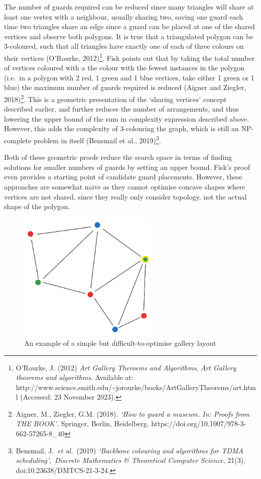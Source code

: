 \documentclass[
]{article}
\begin{document}
The number of guards required can be reduced since many triangles will
share at least one vertex with a neighbour, usually sharing two, saving
one guard each time two triangles share an edge since a guard can be
placed at one of the shared vertices and observe both polygons. It is
true that a triangulated polygon can be 3-coloured, such that all
triangles have exactly one of each of three colours on their vertices
(O'Rourke, 2012)\footnote{O'Rourke, J. (2012) \emph{Art Gallery Theroems
  and Algorithms}, \emph{Art Gallery theorems and algorithms}. Available
  at:
  http://www.science.smith.edu/\textasciitilde jorourke/books/ArtGalleryTheorems/art.html
  (Accessed: 23 November 2023).}. Fisk points out that by taking the
total number of vertices coloured with a the colour with the fewest
instances in the polygon (i.e.~in a polygon with 2 red, 1 green and 1
blue vertices, take either 1 green or 1 blue) the maximum number of
guards required is reduced (Aigner and Ziegler, 2018)\footnote{Aigner,
  M., Ziegler, G.M. (2018). \emph{`How to guard a museum. In: Proofs
  from THE BOOK'}. Springer, Berlin, Heidelberg.
  https://doi.org/10.1007/978-3-662-57265-8\_40}. This is a geometric
presentation of the `sharing vertices' concept described earlier, and
further reduces the number of arrangements, and thus lowering the upper
bound of the sum in complexity expression described above. However, this
adds the complexity of 3-colouring the graph, which is still an
NP-complete problem in itself (Bensmail et al., 2019)\footnote{Bensmail,
  J.~\emph{et al.}~(2019) \emph{`Backbone colouring and algorithms for
  TDMA scheduling'},~\emph{Discrete Mathematics \& Theoretical Computer
  Science}, 21(3). doi:10.23638/DMTCS-21-3-24.}.

Both of these geometric proofs reduce the search space in terms of
finding solutions for smaller numbers of guards by setting an upper
bound. Fisk's proof even provides a starting point of candidate guard
placements. However, these approaches are somewhat naive as they cannot
optimise concave shapes where vertices are not shared, since they really
only consider topology, not the actual shape of the polygon.

\begin{figure}
\centering
\includegraphics[width=0.6\textwidth,height=\textheight]{diagrams/complicated_gallery.png}
\caption{An example of a simple but difficult-to-optimise gallery
layout}
\end{figure}
\end{document}

